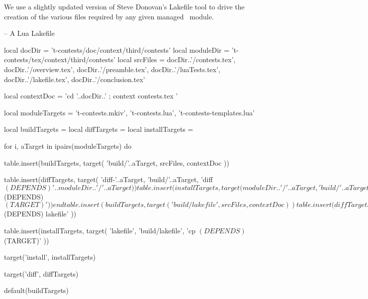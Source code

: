 
\startchapter[title=Lakefile]

We use a slightly updated version of Steve Donovan's Lakefile tool to 
drive the creation of the various files required by any given 
 managed \ConTeXt\ module. 

\startLakefile
-- A Lua Lakefile

local docDir    = 't-contests/doc/context/third/contests'
local moduleDir = 't-contests/tex/context/third/contests'
local srcFiles = {
  docDir..'/contests.tex',
  docDir..'/overview.tex',
  docDir..'/preamble.tex',
  docDir..'/luaTests.tex',
  docDir..'/lakefile.tex',
  docDir..'/conclusion.tex'
}

local contextDoc = 
  'cd '..docDir..' ; context contests.tex '

local moduleTargets = {
  't-contests.mkiv',
  't-contests.lua',
  't-contests-templates.lua'
}

local buildTargets   = { }
local diffTargets    = { }
local installTargets = { }

for i, aTarget in ipairs(moduleTargets) do

  table.insert(buildTargets, target(
    'build/'..aTarget,
    srcFiles,
    contextDoc
  ))

  table.insert(diffTargets, target(
    'diff-'..aTarget,
    'build/'..aTarget,
    'diff $(DEPENDS) '..moduleDir..'/'..aTarget
  ))

  table.insert(installTargets, target(
    moduleDir..'/'..aTarget,
    'build/'..aTarget,
    'cp $(DEPENDS) $(TARGET)'
  ))
end

table.insert(buildTargets, target(
  'build/lakefile',
  srcFiles,
  contextDoc
))

table.insert(diffTargets, target(
  'diff-lakefile',
  'build/lakefile',
  'diff $(DEPENDS) lakefile'
))

table.insert(installTargets, target(
  'lakefile',
  'build/lakefile',
  'cp $(DEPENDS) $(TARGET)'
))

target('install', installTargets)

target('diff', diffTargets)

default(buildTargets)

\stopLakefile

\stopchapter